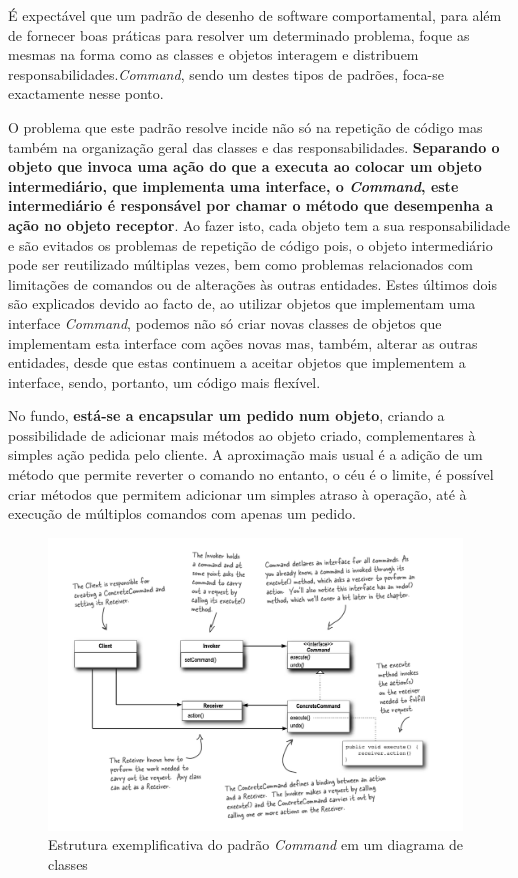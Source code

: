 \documentclass[10pt,portuguese]{article}
\begin{document}
\par É expectável que um padrão de desenho de software comportamental, para além de fornecer boas práticas para resolver um determinado problema, foque as mesmas na forma como as classes e objetos interagem e distribuem responsabilidades.\textit{Command}, sendo um destes tipos de padrões, foca-se exactamente nesse ponto.

\par O problema que este padrão resolve incide não só na repetição de código mas também na organização geral das classes e das responsabilidades. \textbf{Separando o objeto que invoca uma ação do que a executa ao colocar um objeto intermediário, que implementa uma interface, o \textit{Command}, este intermediário é responsável por chamar o método que desempenha a ação no objeto receptor}.
Ao fazer isto, cada objeto tem a sua responsabilidade e são evitados os problemas de repetição de código pois, o objeto intermediário pode ser reutilizado múltiplas vezes, bem como problemas relacionados com limitações de comandos ou de alterações às outras entidades. Estes últimos dois são explicados devido ao facto de, ao utilizar objetos que implementam uma interface \textit{Command}, podemos não só criar novas classes de objetos que implementam esta interface com ações novas mas, também, alterar as outras entidades, desde que estas continuem a aceitar objetos que implementem a interface, sendo, portanto, um código mais flexível.

\par No fundo, \textbf{está-se a encapsular um pedido num objeto}, criando a possibilidade de adicionar mais métodos ao objeto criado, complementares à simples ação pedida pelo cliente.
A aproximação mais usual é a adição de um método que permite reverter o comando no entanto, o céu é o limite, é possível criar métodos que permitem adicionar um simples atraso à operação, até à execução de múltiplos comandos com apenas um pedido.


\begin{figure}[!h]
    \centering
    \includegraphics[width=415]{images/command/UML.png}
    \caption{Estrutura exemplificativa do padrão \textit{Command} em um diagrama de classes}
\end{figure}
\end{document}
